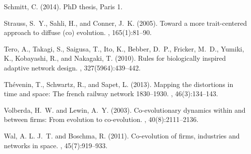 \documentclass[11pt]{article}
\begin{document}
\begin{thebibliography}{}
Schmitt, C. (2014).
\newblock PhD thesis, Paris 1.

Strauss, S.~Y., Sahli, H., and Conner, J.~K. (2005).
\newblock Toward a more trait-centered approach to diffuse (co) evolution.
, 165(1):81--90.

Tero, A., Takagi, S., Saigusa, T., Ito, K., Bebber, D.~P., Fricker, M.~D.,
  Yumiki, K., Kobayashi, R., and Nakagaki, T. (2010).
\newblock Rules for biologically inspired adaptive network design.
, 327(5964):439--442.

Th{\'e}venin, T., Schwartz, R., and Sapet, L. (2013).
\newblock Mapping the distortions in time and space: The french railway network
  1830--1930.
, 46(3):134--143.

Volberda, H.~W. and Lewin, A.~Y. (2003).
\newblock Co-evolutionary dynamics within and between firms: From evolution to
  co-evolution.
, 40(8):2111--2136.

Wal, A. L. J.~T. and Boschma, R. (2011).
\newblock Co-evolution of firms, industries and networks in space.
, 45(7):919--933.

\end{thebibliography}
\end{document}
